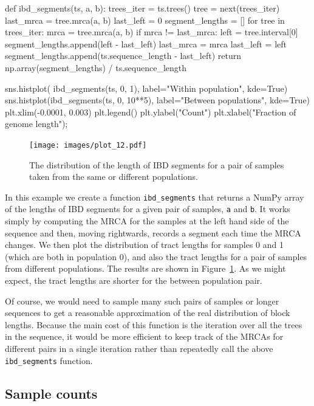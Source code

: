 \documentclass[graybox]{svmult}
\begin{document}
\begin{pythoncode}
def ibd_segments(ts, a, b):
    trees_iter = ts.trees()
    tree = next(trees_iter)
    last_mrca = tree.mrca(a, b)
    last_left = 0
    segment_lengths = []
    for tree in trees_iter:
        mrca = tree.mrca(a, b)
        if mrca != last_mrca:
            left = tree.interval[0]
            segment_lengths.append(left - last_left)
            last_mrca = mrca
            last_left = left
    segment_lengths.append(ts.sequence_length - last_left)
    return np.array(segment_lengths) / ts.sequence_length

sns.histplot(
    ibd_segments(ts, 0, 1), label="Within population", kde=True)
sns.histplot(ibd_segments(ts, 0, 10**5),
    label="Between populations", kde=True)
plt.xlim(-0.0001, 0.003)
plt.legend()
plt.ylabel("Count")
plt.xlabel("Fraction of genome length");
\end{pythoncode}

\begin{figure}
\begin{center}
\texttt{[image: images/plot\_12.pdf]}
\end{center}
\caption{\label{fig:ibd_segments} The distribution of the length of IBD
segments for a pair of samples taken from the same or different populations.}
\end{figure}

In this example we create a function \texttt{ibd\_segments} that returns
a NumPy array of the lengths of IBD segments for a given pair of
samples, \texttt{a} and \texttt{b}. It works simply by computing the
MRCA for the samples at the left hand side of the sequence and then,
moving rightwards, records a segment each time the MRCA changes. We then
plot the distribution of tract lengths for samples 0 and 1 (which are
both in population 0), and also the tract lengths for a pair of
samples from different populations. The results are shown in
Figure~\ref{fig:ibd_segments}. As we might expect, the tract
lengths are shorter for the between population pair.

Of course, we would need to sample many such pairs of samples or longer sequences to
get a reasonable approximation of the real distribution of block lengths.
Because the main cost of this function is the iteration over all the
trees in the sequence, it would be more efficient to keep track of the MRCAs
for different pairs in a single iteration rather than repeatedly
call the above \texttt{ibd\_segments} function.

\subsection{Sample counts}\label{sample-counts}
\end{document}
